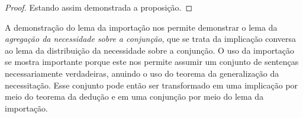 \begin{tcolorbox}[enhanced jigsaw, breakable, sharp corners, colframe=black, colback=white, boxrule=0.5pt, left=1.5mm, right=1.5mm, top=1.5mm, bottom=1.5mm]
\begin{lemma}[Importação]
\begin{proof}
        \vspace{0.5\baselineskip}
        Estando assim demonstrada a proposição.
        \end{proof}
    \end{lemma}
\end{tcolorbox}

\vspace{.5\baselineskip}
A demonstração do lema da importação nos permite demonstrar o lema da \emph{agregação da necessidade sobre a conjunção}, que se trata da implicação conversa ao lema da distribuição da necessidade sobre a conjunção.
O uso da importação se mostra importante porque este nos permite assumir um conjunto de sentenças necessariamente verdadeiras, anuindo o uso do teorema da generalização da necessitação.
Esse conjunto pode então ser transformado em uma implicação por meio do teorema da dedução e em uma conjunção por meio do lema da importação.

